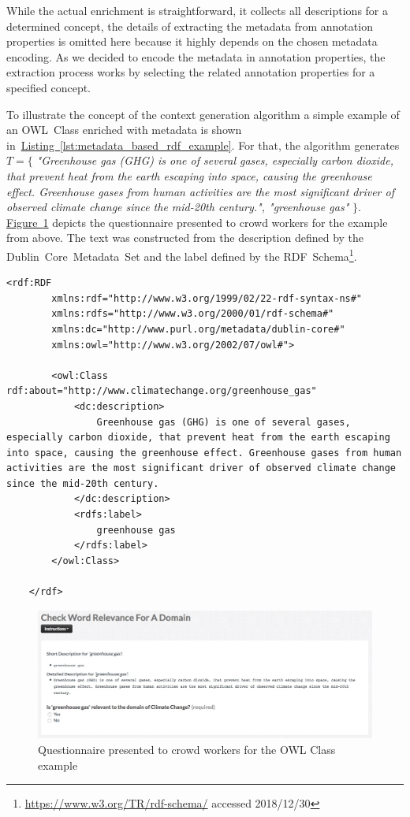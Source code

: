 While the actual enrichment is straightforward, it collects all descriptions for a determined concept, the details of extracting the metadata from annotation properties is omitted here because it highly depends on the chosen metadata encoding.
As we decided to encode the metadata in annotation properties, the extraction process works by selecting the related annotation properties for a specified concept. 

To illustrate the concept of the context generation algorithm a simple example of an OWL~Class enriched with metadata is shown in~\hyperref[lst:metadata_based_rdf_example]{Listing~\ref*{lst:metadata_based_rdf_example}}.
For that, the algorithm generates $T=\{$ \emph{"Greenhouse gas (GHG) is one of several gases, especially carbon dioxide, that prevent heat from the earth escaping into space, causing the greenhouse effect. Greenhouse gases from human activities are the most significant driver of observed climate change since the mid-20th century.", "greenhouse gas"} $\}$. 
\hyperref[fig:metadata_rdf_example_questionaire]{Figure~\ref*{fig:metadata_rdf_example_questionaire}} depicts the questionnaire presented to crowd workers for the example from above. The text was constructed from the description defined by the Dublin~Core~Metadata~Set and the label defined by the RDF~Schema\footnote{\url{https://www.w3.org/TR/rdf-schema/} accessed 2018/12/30}. 

\begin{lstlisting}[frame=single,breaklines=true,postbreak=\mbox{\textcolor{black}{$\hookrightarrow$}\space},caption=An OWL Class enriched with metadata,label=lst:metadata_based_rdf_example]
	<rdf:RDF
		xmlns:rdf="http://www.w3.org/1999/02/22-rdf-syntax-ns#"
		xmlns:rdfs="http://www.w3.org/2000/01/rdf-schema#"
		xmlns:dc="http://www.purl.org/metadata/dublin-core#"
		xmlns:owl="http://www.w3.org/2002/07/owl#">
		
		<owl:Class rdf:about="http://www.climatechange.org/greenhouse_gas"
			<dc:description>
				Greenhouse gas (GHG) is one of several gases, especially carbon dioxide, that prevent heat from the earth escaping into space, causing the greenhouse effect. Greenhouse gases from human activities are the most significant driver of observed climate change since the mid-20th century.
			</dc:description>
			<rdfs:label>
				greenhouse gas
			</rdfs:label>
		</owl:Class>
		
	</rdf>
\end{lstlisting}

\begin{figure}
	 \centering
	 \includegraphics[width=\textwidth]{screenshots/questionaire_metadata_example}
	 \caption{Questionnaire presented to crowd workers for the OWL Class example}\label{fig:metadata_rdf_example_questionaire}
\end{figure}
